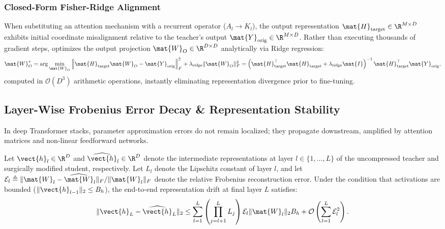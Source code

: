 \subsubsection{Closed-Form Fisher-Ridge Alignment}
When substituting an attention mechanism with a recurrent operator ($A_l \to K_l$), the output representation $\mat{H}_{\text{target}} \in \R^{M \times D}$ exhibits initial coordinate misalignment relative to the teacher's output $\mat{Y}_{\text{orig}} \in \R^{M \times D}$. Rather than executing thousands of gradient steps, \neuralops{} optimizes the output projection $\mat{W}_O \in \R^{D \times D}$ analytically via Ridge regression:
\begin{equation}
\label{eq:closed_form_ridge}
\mat{W}_O^* = \arg\min_{\mat{W}_O} \left\| \mat{H}_{\text{target}} \mat{W}_O - \mat{Y}_{\text{orig}} \right\|_F^2 + \lambda_{\text{ridge}} \|\mat{W}_O\|_F^2 = \left( \mat{H}_{\text{target}}^\top \mat{H}_{\text{target}} + \lambda_{\text{ridge}} \mat{I} \right)^{-1} \mat{H}_{\text{target}}^\top \mat{Y}_{\text{orig}},
\end{equation}
computed in $\mathcal{O}(D^3)$ arithmetic operations, instantly eliminating representation divergence prior to fine-tuning.

\subsection{Layer-Wise Frobenius Error Decay \& Representation Stability}
\label{sec:surgery_error_decay}

In deep Transformer stacks, parameter approximation errors do not remain localized; they propagate downstream, amplified by attention matrices and non-linear feedforward networks.

\begin{theorem}
\label{thm:layerwise_error_bound}
Let $\vect{h}_l \in \R^D$ and $\widehat{\vect{h}}_l \in \R^D$ denote the intermediate representations at layer $l \in \{1, \dots, L\}$ of the uncompressed teacher and surgically modified student, respectively. Let $L_l$ denote the Lipschitz constant of layer $l$, and let $\mathcal{E}_l \triangleq \|\mat{W}_l - \widehat{\mat{W}}_l\|_F / \|\mat{W}_l\|_F$ denote the relative Frobenius reconstruction error. Under the condition that activations are bounded ($\|\vect{h}_{l-1}\|_2 \le B_h$), the end-to-end representation drift at final layer $L$ satisfies:
\begin{equation}
\label{eq:downstream_drift_bound}
\|\vect{h}_L - \widehat{\vect{h}}_L\|_2 \le \sum_{l=1}^L \left( \prod_{j=l+1}^L L_j \right) \mathcal{E}_l \|\mat{W}_l\|_2 B_h + \mathcal{O}\left( \sum_{l=1}^L \mathcal{E}_l^2 \right).
\end{equation}
\end{theorem}

